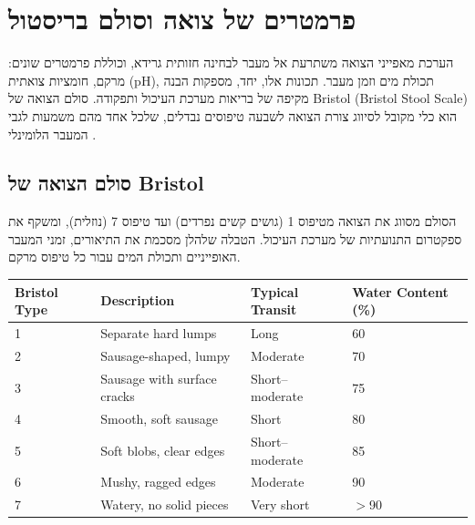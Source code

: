 \section{\texthebrew{פרמטרים של צואה וסולם בריסטול}}

\begin{hebrew}הערכת מאפייני הצואה משתרעת אל מעבר לבחינה חזותית גרידא, וכוללת פרמטרים שונים: מרקם, חומציות צואתית (\textenglish{pH}), תכולת מים וזמן מעבר. תכונות אלו, יחד, מספקות הבנה מקיפה של בריאות מערכת העיכול ותפקודה. סולם הצואה של \textenglish{Bristol} (\textenglish{Bristol Stool Scale}) הוא כלי מקובל לסיווג צורת הצואה לשבעה טיפוסים נבדלים, שלכל אחד מהם משמעות לגבי המעבר הלומינלי \cite{lewis1997}.\end{hebrew}

\subsection{\texthebrew{סולם הצואה של \textenglish{Bristol}}}

\begin{hebrew}הסולם מסווג את הצואה מטיפוס 1 (גושים קשים נפרדים) ועד טיפוס 7 (נוזלית), ומשקף את ספקטרום התנועתיות של מערכת העיכול. הטבלה שלהלן מסכמת את התיאורים, זמני המעבר האופייניים ותכולת המים עבור כל טיפוס מרקם.\end{hebrew}

\begin{table}[h]\centering\small
\setlength{\tabcolsep}{3pt}
\begin{tabular}{llll}
\toprule
\textenglish{Bristol Type} & \textenglish{Description} & \textenglish{Typical Transit} & \textenglish{Water Content (\%)} \\
\midrule
\textenglish{1} & \textenglish{Separate hard lumps} & \textenglish{Long} & \textenglish{60} \\
\textenglish{2} & \textenglish{Sausage-shaped, lumpy} & \textenglish{Moderate} & \textenglish{70} \\
\textenglish{3} & \textenglish{Sausage with surface cracks} & \textenglish{Short--moderate} & \textenglish{75} \\
\textenglish{4} & \textenglish{Smooth, soft sausage} & \textenglish{Short} & \textenglish{80} \\
\textenglish{5} & \textenglish{Soft blobs, clear edges} & \textenglish{Short--moderate} & \textenglish{85} \\
\textenglish{6} & \textenglish{Mushy, ragged edges} & \textenglish{Moderate} & \textenglish{90} \\
\textenglish{7} & \textenglish{Watery, no solid pieces} & \textenglish{Very short} & \textenglish{$>$90} \\
\bottomrule
\end{tabular}
\end{table}

